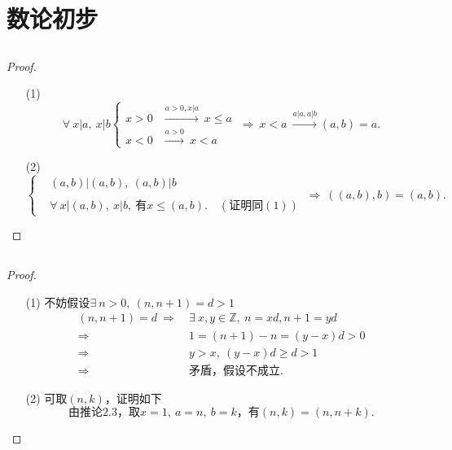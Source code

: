 \documentclass[UTF8]{ctexart}
\begin{document}
\fancyfoot[C]{\thepage}

\section{数论初步}
\subsection{}   %
\begin{proof}
    \begin{enumerate}
        \item []
        \item [(1)]
        \[
            \forall\ x|a,\ x|b
            \begin{cases}
                x>0 &\xrightarrow{a>0,x|a}\ x\leq a\\
                x<0 &\xrightarrow{a>0}\ x<a
            \end{cases}    
            \ \Rightarrow\ 
            x<a\ \xrightarrow{a|a,a|b}
            (a,b)=a.
        \]
        \item [(2)]
        \[
            \begin{cases}
                &(a,b)|(a,b),\ (a,b)|b\\
                \\
                &\forall\ x|(a,b),\ x|b,\ \mbox{有}x\leq (a,b).\quad (\mbox{证明同}(1))
            \end{cases}
            \ \Rightarrow\ 
            \left((a,b),b\right)=(a,b).
        \]
    \end{enumerate}
\end{proof}

\subsection{}   %
\begin{proof}
    \begin{enumerate}
        \item []
        \item [(1)]不妨假设$\exists\ n>0,\ (n,n+1)=d>1$
        \begin{align*}
            (n,n+1)=d\ 
            \Rightarrow\ &
            \exists\ x,y\in \mathbb{Z},\ n=xd,n+1=yd\\
            \Rightarrow\ &
            1=(n+1)-n=(y-x)d>0\\
            \Rightarrow\ &
            y>x,\ (y-x)d\geq d>1\\
            \Rightarrow\ &
            \mbox{矛盾，假设不成立.}
        \end{align*}
        
        \item [(2)]可取$(n,k)$，证明如下
        \[
            \mbox{由推论2.3，取}x=1,\ a=n,\ b=k
            \mbox{，有}(n,k)=(n,n+k).    
        \]
        
    \end{enumerate}
\end{proof}
\end{document}

